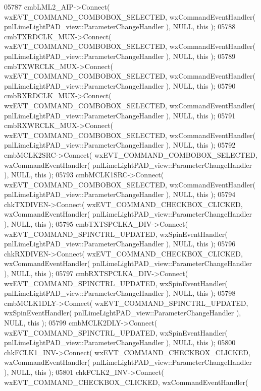 \begin{DoxyCode}
05787     cmbLML2_AIP->Connect( wxEVT\_COMMAND\_COMBOBOX\_SELECTED, wxCommandEventHandler( 
      pnlLimeLightPAD_view::ParameterChangeHandler ), NULL, \textcolor{keyword}{this} );
05788     cmbTXRDCLK_MUX->Connect( wxEVT\_COMMAND\_COMBOBOX\_SELECTED, wxCommandEventHandler( 
      pnlLimeLightPAD_view::ParameterChangeHandler ), NULL, \textcolor{keyword}{this} );
05789     cmbTXWRCLK_MUX->Connect( wxEVT\_COMMAND\_COMBOBOX\_SELECTED, wxCommandEventHandler( 
      pnlLimeLightPAD_view::ParameterChangeHandler ), NULL, \textcolor{keyword}{this} );
05790     cmbRXRDCLK_MUX->Connect( wxEVT\_COMMAND\_COMBOBOX\_SELECTED, wxCommandEventHandler( 
      pnlLimeLightPAD_view::ParameterChangeHandler ), NULL, \textcolor{keyword}{this} );
05791     cmbRXWRCLK_MUX->Connect( wxEVT\_COMMAND\_COMBOBOX\_SELECTED, wxCommandEventHandler( 
      pnlLimeLightPAD_view::ParameterChangeHandler ), NULL, \textcolor{keyword}{this} );
05792     cmbMCLK2SRC->Connect( wxEVT\_COMMAND\_COMBOBOX\_SELECTED, wxCommandEventHandler( 
      pnlLimeLightPAD_view::ParameterChangeHandler ), NULL, \textcolor{keyword}{this} );
05793     cmbMCLK1SRC->Connect( wxEVT\_COMMAND\_COMBOBOX\_SELECTED, wxCommandEventHandler( 
      pnlLimeLightPAD_view::ParameterChangeHandler ), NULL, \textcolor{keyword}{this} );
05794     chkTXDIVEN->Connect( wxEVT\_COMMAND\_CHECKBOX\_CLICKED, wxCommandEventHandler( 
      pnlLimeLightPAD_view::ParameterChangeHandler ), NULL, \textcolor{keyword}{this} );
05795     cmbTXTSPCLKA_DIV->Connect( wxEVT\_COMMAND\_SPINCTRL\_UPDATED, wxSpinEventHandler( 
      pnlLimeLightPAD_view::ParameterChangeHandler ), NULL, \textcolor{keyword}{this} );
05796     chkRXDIVEN->Connect( wxEVT\_COMMAND\_CHECKBOX\_CLICKED, wxCommandEventHandler( 
      pnlLimeLightPAD_view::ParameterChangeHandler ), NULL, \textcolor{keyword}{this} );
05797     cmbRXTSPCLKA_DIV->Connect( wxEVT\_COMMAND\_SPINCTRL\_UPDATED, wxSpinEventHandler( 
      pnlLimeLightPAD_view::ParameterChangeHandler ), NULL, \textcolor{keyword}{this} );
05798     cmbMCLK1DLY->Connect( wxEVT\_COMMAND\_SPINCTRL\_UPDATED, wxSpinEventHandler( 
      pnlLimeLightPAD_view::ParameterChangeHandler ), NULL, \textcolor{keyword}{this} );
05799     cmbMCLK2DLY->Connect( wxEVT\_COMMAND\_SPINCTRL\_UPDATED, wxSpinEventHandler( 
      pnlLimeLightPAD_view::ParameterChangeHandler ), NULL, \textcolor{keyword}{this} );
05800     chkFCLK1_INV->Connect( wxEVT\_COMMAND\_CHECKBOX\_CLICKED, wxCommandEventHandler( 
      pnlLimeLightPAD_view::ParameterChangeHandler ), NULL, \textcolor{keyword}{this} );
05801     chkFCLK2_INV->Connect( wxEVT\_COMMAND\_CHECKBOX\_CLICKED, wxCommandEventHandler( 

\end{DoxyCode}
